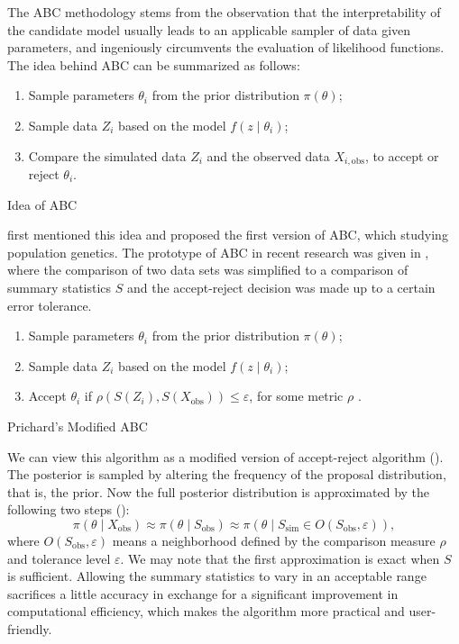 \documentclass[oneside,english]{amsbook}
\numberwithin{section}{chapter}
\numberwithin{equation}{section}
\numberwithin{figure}{section}
\theoremstyle{plain}
\theoremstyle{plain}
\theoremstyle{definition}
\theoremstyle{plain}
\theoremstyle{plain}
\theoremstyle{remark}
\theoremstyle{definition}
\theoremstyle{definition}
\begin{document}
The ABC methodology  {stems from} the observation
that the interpretability of the candidate model usually leads to
an applicable sampler of data given parameters, and ingeniously circumvents
the evaluation of likelihood functions. The idea behind ABC can be
summarized as follows: 
\begin{algorithm}[H]
\begin{enumerate}
\item Sample parameters $\theta_{i}$ from the prior distribution $\pi\left(\theta\right)$;
\item Sample data $Z_{i}$ based on the model $f\left(z\mid\theta_{i}\right)$;
\item Compare the simulated data $Z_{i}$ and the observed data $X_{i,\mathrm{obs}}$,
to accept or reject $\theta_{i}$.
\end{enumerate}
\protect\caption{Idea of ABC}
\end{algorithm}
 \citet{rubin1984bayesianly} first mentioned this idea and \citet{tavare1997inferring}
proposed the first version of ABC, which studying population genetics.
The prototype of ABC in recent research was given in \citet{pritchard1999population},
where the comparison of two data sets was simplified to a comparison
of summary statistics $S$ and the accept-reject decision was made
up to a certain error tolerance. 
\begin{algorithm}[h]
\begin{enumerate}
\item Sample parameters $\theta_{i}$ from the prior distribution $\pi\left(\theta\right)$;
\item Sample data $Z_{i}$ based on the model $f\left(z\mid\theta_{i}\right)$;
\item Accept $\theta_{i}$ if $\rho\left(S\left(Z_{i}\right),S\left(X_{\mathrm{obs}}\right)\right)\le\varepsilon$, {{}
} {for some metric $\rho$} {.}
\end{enumerate}
\protect\caption{\label{alg:Prichard-ABC-1}Prichard's Modified ABC}
\end{algorithm}
We can view this algorithm as a modified version of accept-reject
algorithm (\citet{robert2013monte}). The posterior is sampled by
altering the frequency of the proposal distribution, that is, the
prior. Now the full posterior distribution is approximated by the
following two steps (\citet{fearnhead2012constructing}): 
\begin{equation}
\pi\left(\theta\mid X_{\mathrm{obs}}\right)\approx\pi\left(\theta\mid S_{\mathrm{obs}}\right)\approx\pi\left(\theta\mid S_{\mathrm{sim}}\in O\left(S_{\mathrm{obs}},\varepsilon\right)\right),\label{eq:two-step-approx-abc}
\end{equation}
where $O\left(S_{\mathrm{obs}},\varepsilon\right)$ means a neighborhood
defined by the comparison measure $\rho$ and tolerance level $\varepsilon$.
We may note that the first approximation is exact when $S$ is sufficient.
Allowing the summary statistics to vary in an acceptable range sacrifices
a little accuracy in exchange for a significant improvement in computational
efficiency, which {makes } the algorithm more practical
and user-friendly. 
\end{document}
